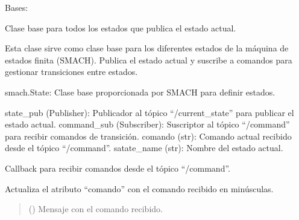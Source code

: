 \documentclass[a4paper,10pt,spanish]{sphinxmanual}
\begin{document}
\begin{fulllineitems}
\label{\detokenize{squad_state_manager:squad_state_manager.BaseState}}
\pysigstartsignatures
{}
\pysigstopsignatures
\sphinxAtStartPar
Bases: 

\sphinxAtStartPar
Clase base para todos los estados que publica el estado actual.

\sphinxAtStartPar
Esta clase sirve como clase base para los diferentes estados de la máquina de estados finita (SMACH).
Publica el estado actual y suscribe a comandos para gestionar transiciones entre estados.
\begin{description}
\sphinxAtStartPar
smach.State: Clase base proporcionada por SMACH para definir estados.

\sphinxAtStartPar
state\_pub (Publisher): Publicador al tópico “/current\_state” para publicar el estado actual.
command\_sub (Subscriber): Suscriptor al tópico “/command” para recibir comandos de transición.
comando (str): Comando actual recibido desde el tópico “/command”.
satate\_name (str): Nombre del estado actual.

\end{description}

\begin{fulllineitems}
\label{\detokenize{squad_state_manager:squad_state_manager.BaseState.command_callback}}
\pysigstartsignatures
{}
\pysigstopsignatures
\sphinxAtStartPar
Callback para recibir comandos desde el tópico “/command”.

\sphinxAtStartPar
Actualiza el atributo “comando” con el comando recibido en minúsculas.
\begin{quote}\begin{description}
\sphinxAtStartPar
{} () \textendash{} Mensaje con el comando recibido.

\end{description}\end{quote}


\end{fulllineitems}
\end{fulllineitems}
\end{document}
